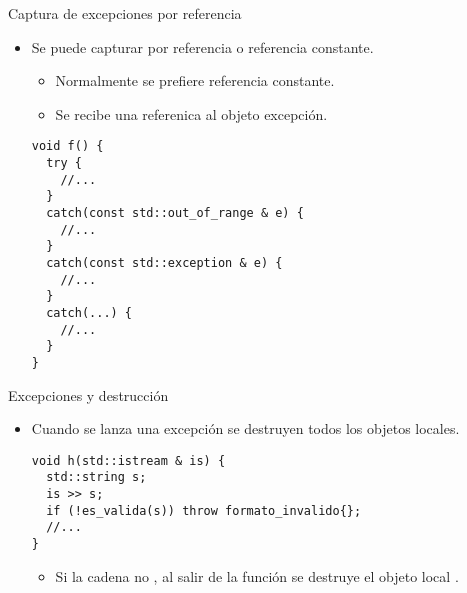 \begin{frame}[t,fragile]{Captura de excepciones por referencia}
\begin{itemize}
  \item Se puede capturar por referencia o referencia constante.
    \begin{itemize}
      \item Normalmente se prefiere referencia constante.
      \item Se recibe una referenica al objeto excepción.
    \end{itemize}
\begin{lstlisting}
void f() {
  try {
    //...
  }
  catch(const std::out_of_range & e) {
    //...
  }
  catch(const std::exception & e) {
    //...
  }
  catch(...) {
    //...
  }
}
\end{lstlisting}
\end{itemize}
\end{frame}

\begin{frame}[t,fragile]{Excepciones y destrucción}
\begin{itemize}
  \item Cuando se lanza una excepción se destruyen todos los objetos locales.
\begin{lstlisting}
void h(std::istream & is) {
  std::string s;
  is >> s;
  if (!es_valida(s)) throw formato_invalido{};
  //...
}
\end{lstlisting}
    \begin{itemize}
      \item Si la cadena  no , al salir de
            la función se destruye el objeto local .
    \end{itemize}
\end{itemize}
\end{frame}

